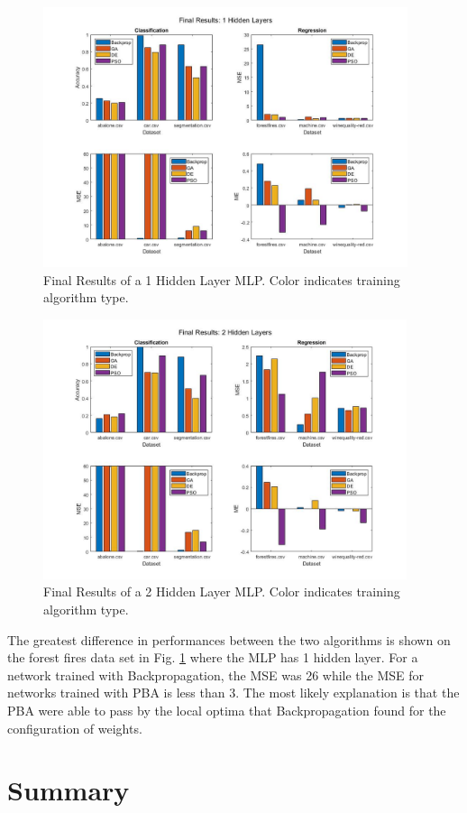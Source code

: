 \documentclass[twoside,11pt]{article}
\begin{document}
	\begin{figure}[h]
		\centering
		\includegraphics[height=3in]{FINAL_FIGS/1_hl.jpg}
		\caption{Final Results of a 1 Hidden Layer MLP. Color indicates training algorithm type.}
		\label{1-hl}
	\end{figure}
	
	\begin{figure}[h]
		\centering
		\includegraphics[height=3in]{FINAL_FIGS/2_hl.jpg}
		\caption{Final Results of a 2 Hidden Layer MLP. Color indicates training algorithm type.}
		\label{2-hl}
	\end{figure}

	The greatest difference in performances between the two algorithms is shown on the forest fires data set in Fig. \ref{1-hl} where the MLP has 1 hidden layer. 
	For a network trained with Backpropagation, the MSE was 26 while the MSE for networks trained with PBA is less than 3. 
	The most likely explanation is that the PBA were able to pass by the local optima that Backpropagation found for the configuration of weights.

\section{Summary}

\newpage


\end{document}
